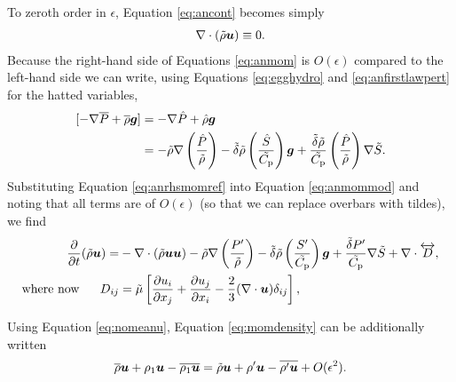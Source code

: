 \documentclass[12pt]{article}
\begin{document}
To zeroth order in $\epsilon$, Equation \eqref{eq:ancont} becomes simply
\begin{align}\label{eq:refcont}
	\nabla\cdot(\tilde{\rho}\bm{u})\equiv0.
\end{align}
Because the right-hand side of Equations \eqref{eq:anmom} is $O(\epsilon)$ compared to the left-hand side we can write, using Equations \eqref{eq:egghydro} and \eqref{eq:anfirstlawpert} for the hatted variables,
\begin{align}\label{eq:anrhsmomref}
	[-\nabla \overline{P} + \overline{\rho}\bm{g}] &= -\nabla \hat{P} + \hat{\rho}\bm{g}\nonumber\\
	&= -\tilde{\rho}\nabla\left(\frac{\hat{P}}{\tilde{\rho}}\right) - \tilde{\delta}  \tilde{\rho} \left(\frac{\hat{S}}{\tilde{C_{\rm{p}}}}\right) \bm{g} + \frac{\tilde{\delta} \tilde{\rho}}{\tilde{C_{\rm{p}}}} \left(\frac{\hat{P}}{\tilde{\rho}}\right)\nabla\tilde{S}.
\end{align}
Substituting Equation \eqref{eq:anrhsmomref} into Equation \eqref{eq:anmommod} and noting that all terms are of $O(\epsilon)$ (so that we can replace overbars with tildes), we find
\begin{subequations}\label{eq:refmom}
	\begin{align}\label{eq:refmommain}
	\frac{\partial}{\partial t}(\tilde{\rho}\bm{u})= &-\nabla\cdot(\tilde{\rho}\bm{u}\bm{u}) -\tilde{\rho}\nabla\left(\frac{{P^\prime}}{\tilde{\rho}}\right) - \tilde{\delta} \tilde{\rho} \left(\frac{{S^\prime}}{\tilde{C_{\rm{p}}}}\right) \bm{g} +\frac{\tilde{\delta}  {P^\prime}}{\tilde{C_{\rm{p}}}} \nabla\tilde{S}+\nabla\cdot \overleftrightarrow{D},\\
	\text{where now}\ \ \ \ \  D_{ij}& = \tilde{\mu}\left[\frac{\partial u_i}{\partial x_j} + \frac{\partial u_j}{\partial x_i} - \frac{2}{3}(\nabla\cdot\bm{u})\delta_{ij}\right]\label{eq:refmomvisc},
\end{align}
\end{subequations}

Using Equation \eqref{eq:nomeanu}, Equation \eqref{eq:momdensity} can be additionally written
  \begin{align}\label{eq:momdensity2}
\overline{\rho}\bm{u} + \rho_1\bm{u} - \overline{\rho_1\bm{u}} = \tilde{\rho}\bm{u} + {\rho^\prime}\bm{u} - \overline{{\rho^\prime}\bm{u}} + O(\epsilon^2).
\end{align}
\end{document}
